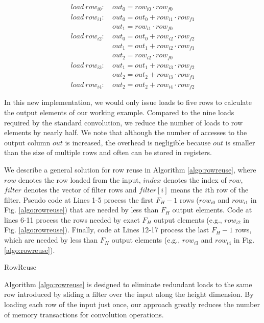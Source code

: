 \begin{equation}\nonumber
\begin{aligned}
load\ row_{i0}:
&\ out_0=row_{i0} \cdot row_{f0} \\
load\ row_{i1}:
&\ out_0 = out_0+row_{i1} \cdot row_{f1}\\
&\ out_1=row_{i1} \cdot row_{f0}\\
load\ row_{i2}:
&\ out_0 = out_0+row_{i2} \cdot row_{f2}\\
&\ out_1 = out_1+row_{i2} \cdot row_{f1}\\
&\ out_{2}=row_{i2} \cdot row_{f0}\\
load\ row_{i3}:
&\ out_1=out_1+row_{i3} \cdot row_{f2} \\
&\ out_2=out_2+row_{i3} \cdot row_{f1}\\
load\ row_{i4}:
&\ out_2=out_2+row_{i4} \cdot row_{f2}
\end{aligned}	
\end{equation}

In this new implementation, we would only issue loads to five rows to calculate the output elements of our working example. Compared to the
nine loads required by the standard convolution, we reduce the number of loads to row elements by nearly half. We note that although the
number of accesses to the output column $out$ is increased, the overhead is negligible because $out$ is smaller than the size of multiple
rows and often can be stored in registers.

We describe a general solution for row reuse in Algorithm \ref{algo:rowreuse}, where $row$ denotes the row loaded from the input, $index$ denotes the index of $row$, $filter$ denotes the vector of filter rows and $filter[i]$ means the $i$th row of the filter.
Pseudo code at Lines 1-5 process the first $F_H-1$ rows ($row_{i0}$ and $row_{i1}$ in Fig. \ref{algo:rowreuse}) that are needed by less than $F_H$ output elements.
Code at lines 6-11 process the rows needed by exact $F_H$ output elements (e.g., $row_{i2}$ in Fig. \ref{algo:rowreuse}).
Finally, code at Lines 12-17 process the last $F_H-1$ rows, which are needed by less than $F_H$ output elements (e.g., $row_{i3}$ and $row_{i4}$ in Fig. \ref{algo:rowreuse}).

\begin{algorithm}[t!]
\small
	\caption{RowReuse}
	\label{algo:rowreuse}
\end{algorithm}

Algorithm \ref{algo:rowreuse} is designed to eliminate redundant loads to the same row introduced by sliding a filter over the input along the height dimension.
By loading each row of the input just once, our approach greatly reduces the number of memory transactions for convolution operations.
